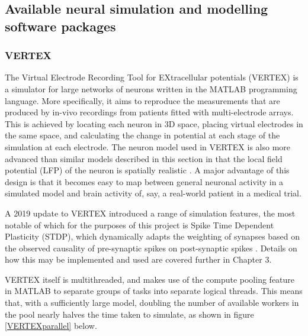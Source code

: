 \subsection{Available neural simulation and modelling software packages}

\subsubsection{VERTEX}
The Virtual Electrode Recording Tool for EXtracellular potentials (VERTEX) is a
simulator for large networks of neurons written in the MATLAB programming
language. More specifically, it aims to reproduce the measurements that are
produced by in-vivo recordings from patients fitted with multi-electrode
arrays. This is achieved by locating each neuron in 3D space, placing virtual
electrodes in the same space, and calculating the change in potential at each
stage of the simulation at each electrode. The neuron model used in VERTEX is
also more advanced than similar models described in this section in that the
local field potential (LFP) of the neuron is spatially realistic
\autocite{tomsett_virtual_2015}. A major advantage of this design is that it
becomes easy to map between general neuronal activity in a simulated model and
brain activity of, say, a real-world patient in a medical trial.

A 2019 update to VERTEX introduced a range of simulation features, the most
notable of which for the purposes of this project is Spike Time Dependent
Plasticity (STDP), which dynamically adapts the weighting of synapses based on
the observed causality of pre-synaptic spikes on post-synaptic spikes
\autocite{thornton_virtual_2019}. Details on how this may be implemented and
used are covered further in Chapter 3. %

VERTEX itself is multithreaded, and makes use of the compute pooling feature in
MATLAB to separate groups of tasks into separate logical threads. This means
that, with a sufficiently large model, doubling the number of available workers
in the pool nearly halves the time taken to simulate, as shown in figure
\ref{VERTEXparallel} below.

